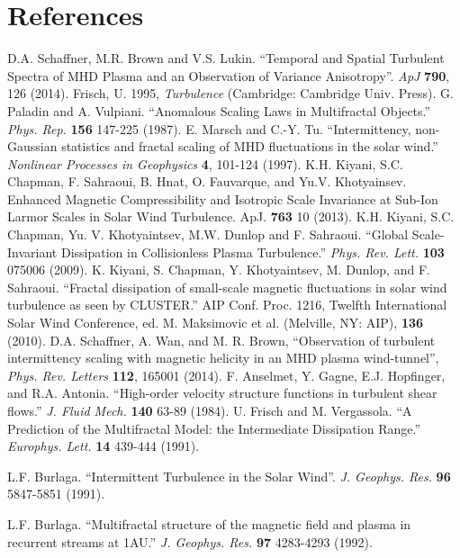 \documentclass[aps,prl,amsmath,amssymb,reprint,superscriptaddress]{revtex4-1} %
\begin{document}
\section*{References}
\begin{thebibliography}{99}

 D.A. Schaffner, M.R. Brown and V.S. Lukin. ``Temporal and Spatial Turbulent Spectra of MHD Plasma and an Observation of Variance Anisotropy''. {\it ApJ} {\bf 790}, 126 (2014).
 Frisch, U. 1995, {\it Turbulence} (Cambridge: Cambridge Univ. Press).
 G. Paladin and A. Vulpiani. ``Anomalous Scaling Laws in Multifractal Objects.'' {\it Phys. Rep.} {\bf 156} 147-225 (1987).
 E. Marsch and C.-Y. Tu. ``Intermittency, non-Gaussian statistics and fractal scaling of MHD fluctuations in the solar wind.'' {\it Nonlinear Processes in Geophysics} {\bf 4}, 101-124 (1997).
 K.H. Kiyani, S.C. Chapman, F. Sahraoui, B. Hnat, O. Fauvarque, and Yu.V. Khotyainsev. Enhanced Magnetic Compressibility and Isotropic Scale Invariance at Sub-Ion Larmor Scales in Solar Wind Turbulence. ApJ. {\bf 763} 10 (2013).
 K.H. Kiyani, S.C. Chapman, Yu. V. Khotyaintsev, M.W. Dunlop and F. Sahraoui. ``Global Scale-Invariant Dissipation in Collisionless Plasma Turbulence.'' {\it Phys. Rev. Lett.} {\bf 103} 075006 (2009). 
 K. Kiyani, S. Chapman, Y. Khotyaintsev, M. Dunlop, and F. Sahraoui. ``Fractal dissipation of small-scale magnetic fluctuations in solar wind turbulence as seen by CLUSTER.'' AIP Conf. Proc. 1216, Twelfth International Solar Wind Conference, ed. M. Maksimovic et al. (Melville, NY: AIP), {\bf 136} (2010).
 D.A. Schaffner, A. Wan, and M. R. Brown, ``Observation of turbulent intermittency scaling with magnetic helicity in an MHD plasma wind-tunnel'', {\it Phys. Rev. Letters} {\bf 112}, 165001 (2014).
 F. Anselmet, Y. Gagne, E.J. Hopfinger, and R.A. Antonia. ``High-order velocity structure functions in turbulent shear flows.'' {\it J. Fluid Mech.} {\bf 140} 63-89 (1984).
 U. Frisch and M. Vergassola. ``A Prediction of the Multifractal Model: the Intermediate Dissipation Range.'' {\it Europhys. Lett.} {\bf 14} 439-444 (1991).

 L.F. Burlaga. ``Intermittent Turbulence in the Solar Wind''. {\it J. Geophys. Res.} {\bf 96} 5847-5851 (1991).

 L.F. Burlaga. ``Multifractal structure of the magnetic field and plasma in recurrent streams at 1AU.'' {\it J. Geophys. Res.} {\bf 97} 4283-4293 (1992).


\end{thebibliography}
\end{document}
